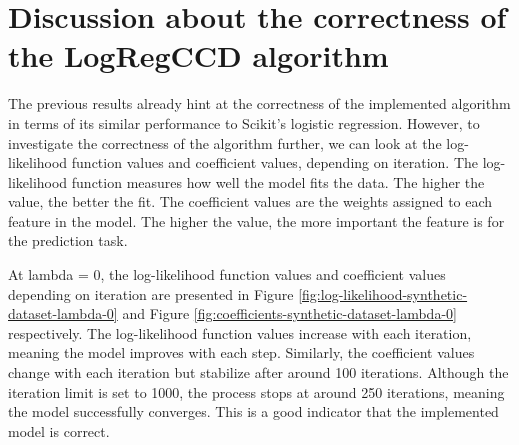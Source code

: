 \documentclass[11pt]{article}
\begin{document}
\section{Discussion about the correctness of the LogRegCCD algorithm}

The previous results already hint at the correctness of the implemented algorithm in terms of its similar performance to Scikit's logistic regression. However, to investigate the correctness of the algorithm further, we can look at the log-likelihood function values and coefficient values, depending on iteration. The log-likelihood function measures how well the model fits the data. The higher the value, the better the fit. The coefficient values are the weights assigned to each feature in the model. The higher the value, the more important the feature is for the prediction task. \par

At lambda = 0, the log-likelihood function values and coefficient values depending on iteration are presented in Figure \ref{fig:log-likelihood-synthetic-dataset-lambda-0} and Figure \ref{fig:coefficients-synthetic-dataset-lambda-0} respectively. The log-likelihood function values increase with each iteration, meaning the model improves with each step. Similarly, the coefficient values change with each iteration but stabilize after around 100 iterations. Although the iteration limit is set to 1000, the process stops at around 250 iterations, meaning the model successfully converges. This is a good indicator that the implemented model is correct.\par
\end{document}
